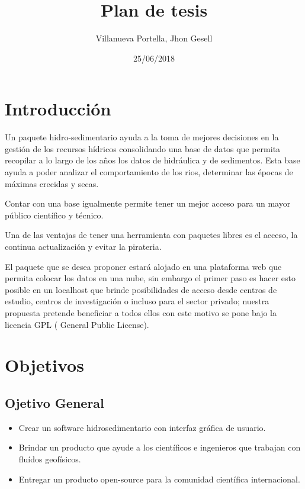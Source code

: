 \documentclass[a4paper,openright,12pt]{report}
\begin{document}
\title{Plan de tesis}
\author{Villanueva Portella, Jhon Gesell}
\date{25/06/2018}
\maketitle

\section{Introducci\'on}
Un paquete hidro-sedimentario ayuda a la toma de mejores decisiones en la gesti\'on de los recursos h\'idricos consolidando una base de datos que permita recopilar a lo largo de los años los datos de hidr\'aulica y de sedimentos. Esta base ayuda a poder analizar el comportamiento de los rios, determinar las \'epocas de m\'aximas crecidas y secas.

Contar con una base igualmente permite tener un mejor acceso para un mayor p\'ublico cient\'ifico y t\'ecnico.

Una de las ventajas de tener una herramienta con paquetes libres es el acceso, la continua actualizaci\'on y evitar la pirateria.



El paquete que se desea proponer estar\'a alojado en una plataforma web que permita colocar los datos en una nube, sin embargo el primer paso es hacer esto posible en un localhost que  brinde posibilidades de acceso desde centros de estudio, centros de investigaci\'on o incluso para el sector privado; nuestra propuesta pretende beneficiar a todos ellos con este motivo se pone bajo la licencia GPL ( General Public License).
\section{Objetivos}
	\subsection{Ojetivo General}
	\begin{itemize}
	\item Crear un software hidrosedimentario con interfaz gr\'afica de usuario.
	\item Brindar un producto que ayude a los cient\'ificos e ingenieros que trabajan con flu\'idos geof\'isicos.
	\item Entregar un producto open-source para la comunidad cient\'ifica internacional.
	\end{itemize}
\end{document}
